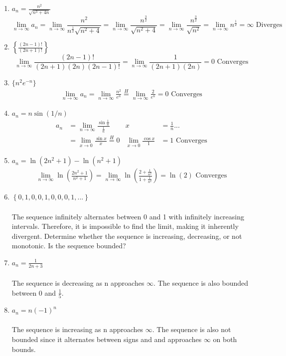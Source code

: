 \documentclass[12pt]{article}
\begin{document}
\begin{enumerate}
    \addtocounter{enumi}{3}\item $a_n=\frac{n^2}{\sqrt{n^3+4n}}$
    \begin{equation*}
        \lim_{n\to\infty}a_n=\lim_{n\to\infty}\frac{n^2}{n^\frac{1}{2}\sqrt{n^2+4}} = \lim_{n\to\infty}\frac{n^\frac{3}{2}}{\sqrt{n^2+4}}=\lim_{n\to\infty}\frac{n^\frac{3}{2}}{\sqrt{n^2}}=\lim_{n\to\infty}n^\frac{1}{2}=\infty \text{ Diverges}
    \end{equation*}
    \addtocounter{enumi}{3}\item $\left\{\frac{(2n-1)!}{(2n+1)!}\right\}$\
    \begin{equation*}
        \lim_{n\to\infty}\frac{(2n-1)!}{(2n+1)(2n)(2n-1)!}=\lim_{n\to\infty}\frac{1}{(2n+1)(2n)} = 0 \text{ Converges}
    \end{equation*}
    \addtocounter{enumi}{3}\item $\{n^2e^{-n}\}$
        \begin{align*}
            \lim_{n\to\infty}a_n=\lim_{n\to\infty}\frac{n^2}{e^n}\stackrel{H}{=}\lim_{n\to\infty}\frac{2}{e^n}=0 \text{ Converges}
        \end{align*}
    \addtocounter{enumi}{3}\item $a_n=n\sin(1/n)$
    \begin{align*}
        a_n&=\lim_{n\to\infty}\frac{\sin{\frac{1}{n}}}{\frac{1}{n}} & x &= \frac{1}{n} ...\\
        &=\lim_{x\to 0}\frac{\sin{x}}{x}\stackrel{H}{=}0
        &\lim_{x\to 0}\frac{\cos{x}}{1}&=1 \text{ Converges}
    \end{align*}
    \addtocounter{enumi}{3}\item $a_n=\ln{(2n^2+1)}-\ln{(n^2+1)}$
    \begin{align*}
        \lim_{n\to\infty}\ln{\left(\frac{2n^2+1}{n^2+1}\right)}=\lim_{n\to\infty}\ln{\left(\frac{2+\frac{1}{n^2}}{1+\frac{1}{n^2}}\right)} = \ln{(2)} \text{ Converges}
    \end{align*}
    \addtocounter{enumi}{3}\item $\left\{0,1,0,0,1,0,0,0,1,...\right\}$\\\\
    The sequence infinitely alternates between 0 and 1 with infinitely increasing intervals. Therefore, it is impossible to find the limit, making it inherently divergent.\newpage
    Determine whether the sequence is increasing, decreasing, or not monotonic. Is the sequence bounded?
    \addtocounter{enumi}{19}\item $a_n=\frac{1}{2n+3}$\\\\
    The sequence is decreasing as n approaches $\infty$. The sequence is also bounded between 0 and $\frac{1}{5}$.
    \addtocounter{enumi}{1}\item $a_n=n(-1)^n$\\\\
    The sequence is increasing as n approaches $\infty$. The sequence is also not bounded since it alternates between signs and and approaches $\infty$ on both bounds.
    

\end{enumerate}
\end{document}
